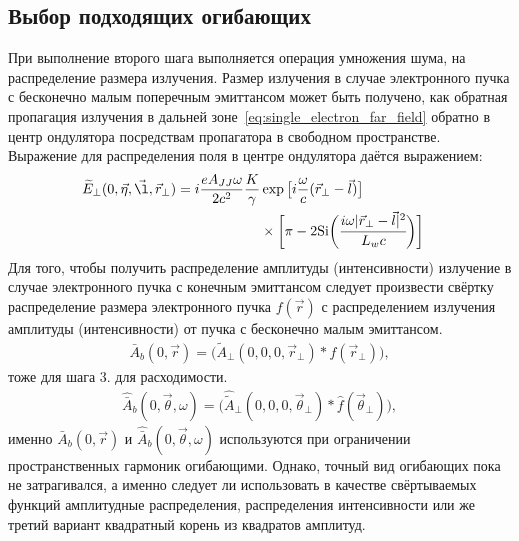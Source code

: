 \subsection{Выбор подходящих огибающих}
При выполнение второго шага выполняется операция умножения шума, на распределение размера излучения. Размер излучения в случае электронного пучка с бесконечно малым поперечным эмиттансом может быть получено, как обратная пропагация излучения в дальней зоне~\ref{eq:single_electron_far_field} обратно в центр ондулятора посредствам пропагатора в свободном пространстве. Выражение для распределения поля в центре ондулятора даётся выражением:
\begin{align}
	\widetilde{E}_{\bot}(0, \vec{\eta}, \vec{\l}, \vec{r}_{\bot}) =
	i \frac{e A_{JJ} \omega}{2 c^2}\frac{K}{\gamma} &\exp{\big[i \frac{\omega}{c} (\vec{r}_{\bot} - \vec{l})\big]}\cr & \times \bigg [\pi - 2\text{Si} \bigg( \cfrac{i \omega |\vec{r}_{\bot} - \vec{l}|^2}{L_w c}\bigg)\bigg]
	\label{eq:single_electron_near_field_z=0}
\end{align}
Для того, чтобы получить распределение амплитуды (интенсивности) излучение в случае электронного пучка с конечным эмиттансом следует произвести свёртку распределение размера электронного пучка $f(\vec{r})$ с распределением излучения амплитуды (интенсивности) от пучка с бесконечно малым эмиттансом. 
\begin{align}
	\bar{A}_{b} (0, \vec{r}) = \big(\widetilde{A}_{\bot}(0, 0, 0, \vec{r}_{\bot}) \ast f(\vec{r}_{\bot})\big), 
\end{align} 
тоже для шага 3. для расходимости.
\begin{align}
	\hat{\bar{A}}_{b} (0, \vec{\theta}, \omega) = \big(\hat{\widetilde{A}}_{\bot}(0, 0, 0, \vec{\theta}_{\bot}) \ast \hat{f}(\vec{\theta}_{\bot})\big), 
\end{align} 
именно $\bar{A}_{b} (0, \vec{r})$ и $\hat{\bar{A}}_{b} (0, \vec{\theta}, \omega)$ используются при ограничении пространственных гармоник огибающими. Однако, точный вид огибающих пока не затрагивался, а именно следует ли использовать в качестве свёртываемых функций амплитудные распределения, распределения интенсивности или же третий вариант квадратный корень из квадратов амплитуд.

